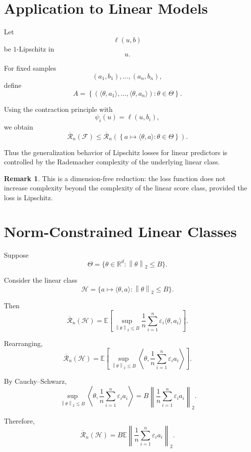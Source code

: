 \documentclass[12pt,oneside]{book}
\numberwithin{equation}{section}
\theoremstyle{definition}
\newtheorem{remark}{Remark}[section]
\theoremstyle{plain}
\theoremstyle{remark}
\newcommand{\R}{\mathbb{R}}
\newcommand{\E}{\mathbb{E}}
\newcommand{\norm}[1]{\left\lVert #1 \right\rVert}
\begin{document}
\section{Application to Linear Models}

Let
\[
\ell(u,b)
\]
be $1$-Lipschitz in
\[
u.
\]

For fixed samples
\[
(a_1,b_1),\dots,(a_n,b_n),
\]
define
\[
A
=
\left\{
(\langle \theta,a_1\rangle,\dots,\langle \theta,a_n\rangle):
\theta\in\Theta
\right\}.
\]

Using the contraction principle with
\[
\psi_i(u)=\ell(u,b_i),
\]
we obtain
\[
\overline{\mathcal{R}}_n(\mathcal{F})
\leq
\overline{\mathcal{R}}_n
\left(
\left\{
a\mapsto \langle \theta,a\rangle:
\theta\in\Theta
\right\}
\right).
\]

Thus the generalization behavior of Lipschitz losses for linear predictors is controlled by the Rademacher complexity of the underlying linear class.

\begin{remark}
This is a dimension-free reduction: the loss function does not increase complexity beyond the complexity of the linear score class, provided the loss is Lipschitz.
\end{remark}

\section{Norm-Constrained Linear Classes}

Suppose
\[
\Theta
=
\{\theta\in\R^d:\norm{\theta}_2\leq B\}.
\]

Consider the linear class
\[
\mathcal{H}
=
\{a\mapsto \langle \theta,a\rangle:\norm{\theta}_2\leq B\}.
\]

Then
\[
\overline{\mathcal{R}}_n(\mathcal{H})
=
\E
\left[
\sup_{\norm{\theta}_2\leq B}
\frac{1}{n}
\sum_{i=1}^n
\varepsilon_i
\langle \theta,a_i\rangle
\right].
\]

Rearranging,
\[
\overline{\mathcal{R}}_n(\mathcal{H})
=
\E
\left[
\sup_{\norm{\theta}_2\leq B}
\left\langle
\theta,
\frac{1}{n}
\sum_{i=1}^n
\varepsilon_i a_i
\right\rangle
\right].
\]

By Cauchy--Schwarz,
\[
\sup_{\norm{\theta}_2\leq B}
\left\langle
\theta,
\frac{1}{n}
\sum_{i=1}^n
\varepsilon_i a_i
\right\rangle
=
B
\left\|
\frac{1}{n}
\sum_{i=1}^n
\varepsilon_i a_i
\right\|_2.
\]

Therefore,
\[
\overline{\mathcal{R}}_n(\mathcal{H})
=
B
\E
\left\|
\frac{1}{n}
\sum_{i=1}^n
\varepsilon_i a_i
\right\|_2.
\]
\end{document}

